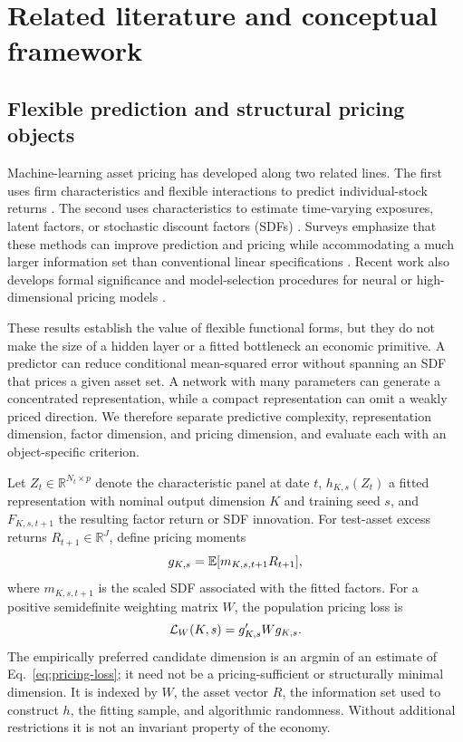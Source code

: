 \section{Related literature and conceptual framework}

\subsection{Flexible prediction and structural pricing objects}

Machine-learning asset pricing has developed along two related lines. The first uses firm characteristics and flexible interactions to predict individual-stock returns \citep{gu2020empirical,leippold2022machine,avramov2023machine}. The second uses characteristics to estimate time-varying exposures, latent factors, or stochastic discount factors (SDFs) \citep{kelly2019characteristics,gu2021autoencoder,chen2024deep,feng2024deep}. Surveys emphasize that these methods can improve prediction and pricing while accommodating a much larger information set than conventional linear specifications \citep{karolyi2020new,giglio2022factor,bagnara2024review}. Recent work also develops formal significance and model-selection procedures for neural or high-dimensional pricing models \citep{fallahgoul2024significance,feng2026stepwise}.

These results establish the value of flexible functional forms, but they do not make the size of a hidden layer or a fitted bottleneck an economic primitive. A predictor can reduce conditional mean-squared error without spanning an SDF that prices a given asset set. A network with many parameters can generate a concentrated representation, while a compact representation can omit a weakly priced direction. We therefore separate predictive complexity, representation dimension, factor dimension, and pricing dimension, and evaluate each with an object-specific criterion.

Let $Z_t\in\mathbb{R}^{N_t\times p}$ denote the characteristic panel at date $t$, $h_{K,s}(Z_t)$ a fitted representation with nominal output dimension $K$ and training seed $s$, and $F_{K,s,t+1}$ the resulting factor return or SDF innovation. For test-asset excess returns $R_{t+1}\in\mathbb{R}^{J}$, define pricing moments
\begin{equation}
 g_{K,s}=\mathbb{E}[m_{K,s,t+1}R_{t+1}],
\end{equation}
where $m_{K,s,t+1}$ is the scaled SDF associated with the fitted factors. For a positive semidefinite weighting matrix $W$, the population pricing loss is
\begin{equation}
 \mathcal{L}_W(K,s)=g_{K,s}'Wg_{K,s}.
 \label{eq:pricing-loss}
\end{equation}
The empirically preferred candidate dimension is an argmin of an estimate of Eq.~\eqref{eq:pricing-loss}; it need not be a pricing-sufficient or structurally minimal dimension. It is indexed by $W$, the asset vector $R$, the information set used to construct $h$, the fitting sample, and algorithmic randomness. Without additional restrictions it is not an invariant property of the economy.

